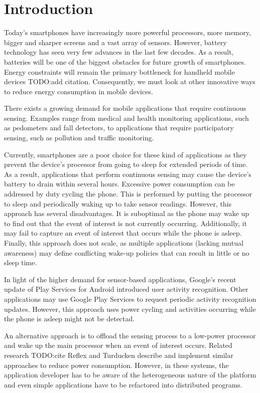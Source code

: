 
\section{\label{sec:Introduction}Introduction}

Today's smartphones have increasingly more powerful processors, more memory, bigger and sharper screens and a vast array of sensors. However, battery technology has seen very few advances in the last few decades. As a result, batteries will be one of the biggest obstacles for future growth of smartphones. Energy constraints will remain the primary bottleneck for handheld mobile devices TODO:add citation. Consequently, we must look at other innovative ways to reduce energy consumption in mobile devices.

There exists a growing demand for mobile applications that require continuous sensing. Examples range from medical and health monitoring applications, such as pedometers and fall detectors, to applications that require participatory sensing, such as pollution and traffic monitoring.

Currently, smartphones are a poor choice for these kind of applications as they prevent the device’s
processor from going to sleep for extended periods of time. As a result, applications that perform
continuous sensing may cause the device's battery to drain within several hours. Excessive power
consumption can be addressed by duty cycling the phone. This is performed by putting the processor
to sleep and periodically waking up to take sensor readings. However, this approach has several
disadvantages. It is suboptimal as the phone may wake up to find out that the event of interest is not
currently occurring. Additionally, it may fail to capture an event of interest that occurs while the phone
is asleep. Finally, this approach does not scale, as multiple applications (lacking mutual awareness) may
define conflicting wake-up policies that can result in little or no sleep time.

In light of the higher demand for sensor-based applications, Google's recent update of Play Services for
Android introduced user activity recognition. Other applications may use Google Play Services to request
periodic activity recognition updates. However, this approach uses power cycling and activities occurring
while the phone is asleep might not be detectad.

An alternative approach is to offload the sensing process to a low-power processor and wake up the
main processor when an event of interest occurs. Related research TODO:cite Reflex and Turducken
describe and implement similar approaches to reduce power consumption. However, in these systems,
the application developer has to be aware of the heterogeneous nature of the platform and even simple
applications have to be refactored into distributed programs.

